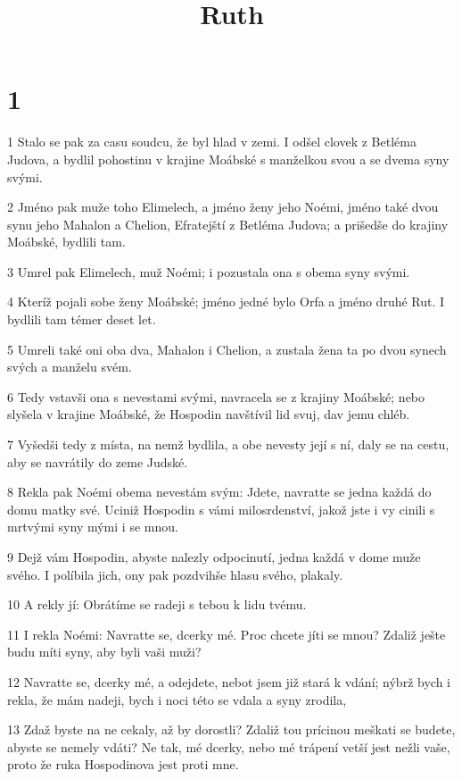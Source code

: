 

\title{Ruth}

\chapter{1}

\par 1 Stalo se pak za casu soudcu, že byl hlad v zemi. I odšel clovek z Betléma Judova, a bydlil pohostinu v krajine Moábské s manželkou svou a se dvema syny svými.
\par 2 Jméno pak muže toho Elimelech, a jméno ženy jeho Noémi, jméno také dvou synu jeho Mahalon a Chelion, Efratejští z Betléma Judova; a prišedše do krajiny Moábské, bydlili tam.
\par 3 Umrel pak Elimelech, muž Noémi; i pozustala ona s obema syny svými.
\par 4 Kteríž pojali sobe ženy Moábské; jméno jedné bylo Orfa a jméno druhé Rut. I bydlili tam témer deset let.
\par 5 Umreli také oni oba dva, Mahalon i Chelion, a zustala žena ta po dvou synech svých a manželu svém.
\par 6 Tedy vstavši ona s nevestami svými, navracela se z krajiny Moábské; nebo slyšela v krajine Moábské, že Hospodin navštívil lid svuj, dav jemu chléb.
\par 7 Vyšedši tedy z místa, na nemž bydlila, a obe nevesty její s ní, daly se na cestu, aby se navrátily do zeme Judské.
\par 8 Rekla pak Noémi obema nevestám svým: Jdete, navratte se jedna každá do domu matky své. Uciniž Hospodin s vámi milosrdenství, jakož jste i vy cinili s mrtvými syny mými i se mnou.
\par 9 Dejž vám Hospodin, abyste nalezly odpocinutí, jedna každá v dome muže svého. I políbila jich, ony pak pozdvihše hlasu svého, plakaly.
\par 10 A rekly jí: Obrátíme se radeji s tebou k lidu tvému.
\par 11 I rekla Noémi: Navratte se, dcerky mé. Proc chcete jíti se mnou? Zdaliž ješte budu míti syny, aby byli vaši muži?
\par 12 Navratte se, dcerky mé, a odejdete, nebot jsem již stará k vdání; nýbrž bych i rekla, že mám nadeji, bych i noci této se vdala a syny zrodila,
\par 13 Zdaž byste na ne cekaly, až by dorostli? Zdaliž tou prícinou meškati se budete, abyste se nemely vdáti? Ne tak, mé dcerky, nebo mé trápení vetší jest nežli vaše, proto že ruka Hospodinova jest proti mne.
